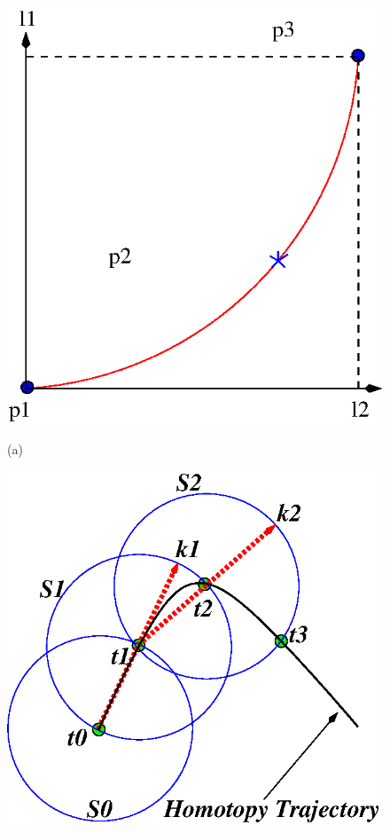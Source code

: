 \documentclass[conference,letterpaper,onecolumn]{IEEEtran}
\begin{document}
\begin{figure}[hbtp]
\centering
\begin{minipage}{\linewidth}
\centering
	\includegraphics[scale=0.7]{fig/curvasl.eps}
\end{minipage}
\newline
\begin{minipage}{\linewidth}
\centering
(a) 
\end{minipage}
\newline
\newline
\begin{minipage}{\linewidth}
\centering
	\includegraphics[scale=0.7]{fig/hiper.eps}

\end{minipage}
\end{figure}
\end{document}
